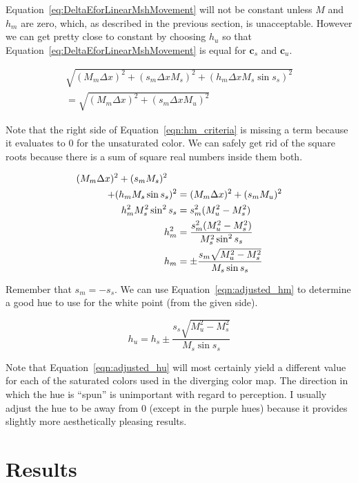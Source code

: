 \documentclass{vgtc}                          %
\newcommand*{\cvec}[1]{\mathbf{#1}}
\begin{document}
Equation~\ref{eq:DeltaEforLinearMshMovement} will not be constant unless
$M$ and $h_m$ are zero, which, as described in the previous section, is
unacceptable.  However we can get pretty close to constant by choosing
$h_u$ so that Equation~\ref{eq:DeltaEforLinearMshMovement} is equal for
$\cvec{c}_s$ and $\cvec{c}_u$.

\begin{multline}
  \sqrt{(M_m \Delta x)^2 + (s_m \Delta x M_s)^2 + (h_m \Delta x M_s \sin s_s)^2}
  \\ =
  \sqrt{(M_m \Delta x)^2 + (s_m \Delta x M_u)^2}
  \label{eqn:hm_criteria}
\end{multline}

Note that the right side of Equation~\ref{eqn:hm_criteria} is missing a
term because it evaluates to 0 for the unsaturated color.  We can safely
get rid of the square roots because there is a sum of square real numbers
inside them both.

\begin{align}
    (M_m \Delta x)^2 + (s_m M_s)^2 \quad & \notag \\
    + (h_m M_s \sin s_s)^2 &= (M_m \Delta x)^2 + (s_m M_u)^2 \notag \\
    h_m^2 M_s^2 \sin^2 s_s &= s_m^2 (M_u^2 - M_s^2) \notag \\
    h_m^2 &= \frac{s_m^2 (M_u^2 - M_s^2)}{M_s^2 \sin^2 s_s} \notag \\
    h_m &= \pm \frac{s_m \sqrt{M_u^2 - M_s^2}}{M_s \sin s_s}
    \label{eqn:adjusted_hm}
\end{align}

Remember that $s_m=-s_s$.  We can use Equation~\ref{eqn:adjusted_hm} to
determine a good hue to use for the white point (from the given side).

\begin{equation}
  h_u = h_s \pm \frac{s_s \sqrt{M_u^2 - M_s^2}}{M_s \sin s_s}
  \label{eqn:adjusted_hu}
\end{equation}

Note that Equation~\ref{eqn:adjusted_hu} will most certainly yield a
different value for each of the saturated colors used in the diverging
color map.  The direction in which the hue is ``spun'' is unimportant with
regard to perception.  I usually adjust the hue to be away from 0 (except
in the purple hues) because it provides slightly more aesthetically
pleasing results.


\section{Results}
\label{sec:Results}
\end{document}
